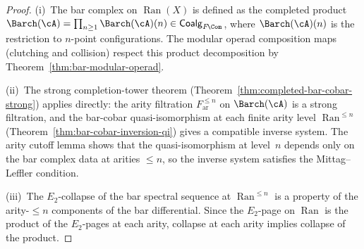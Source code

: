 \begin{proof}
(i)~The bar complex on $\operatorname{Ran}(X)$ is defined as the
completed product
$\Barch(\cA) = \prod_{n \geq 1}
\Barch(\cA)(n) \in \mathsf{Coalg}_{F\!\Com}$,
where $\Barch(\cA)(n)$ is the restriction to $n$-point
configurations.  The modular operad composition maps (clutching
and collision) respect this product decomposition by
Theorem~\ref{thm:bar-modular-operad}.

(ii)~The strong completion-tower theorem
(Theorem~\ref{thm:completed-bar-cobar-strong}) applies directly:
the arity filtration $F_{\mathrm{ar}}^{\leq n}$ on $\Barch(\cA)$
is a strong filtration, and the bar-cobar
quasi-isomorphism at each finite arity level
$\operatorname{Ran}^{\leq n}$ (Theorem~\ref{thm:bar-cobar-inversion-qi})
gives a compatible inverse system.  The arity cutoff lemma shows
that the quasi-isomorphism at level~$n$ depends only on the bar
complex data at arities $\leq n$, so the inverse system satisfies
the Mittag--Leffler condition.

(iii)~The $E_2$-collapse of the bar spectral sequence at
$\operatorname{Ran}^{\leq n}$ is a property of the arity-$\leq n$
components of the bar differential.  Since the $E_2$-page on
$\operatorname{Ran}$ is the product of the $E_2$-pages at each
arity, collapse at each arity implies collapse of the product.
\end{proof}

